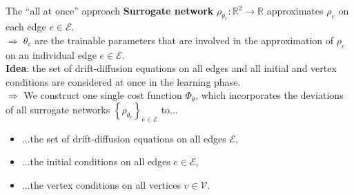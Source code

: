 \documentclass[9pt]{beamer}
\begin{document}
\begin{frame}{The “all at once” approach}
    \textbf{Surrogate network} $\rho_{\theta_e} \colon \mathbb{R}^2 \to \mathbb{R}$ approximates $\rho_e$ on each edge $e \in \mathcal{E}$. \\
    $\Rightarrow \; \theta_e$ are the trainable parameters that are involved in the approximation of $\rho_e$ on an individual edge $e \in \mathcal{E}$. \\
    \vspace{5mm}
    \textbf{Idea}: the set of drift-diffusion equations on all edges and all initial and vertex conditions are considered at once in the learning phase. \\
    \vspace{5mm}
    $\Rightarrow$ We construct one single cost function $\Phi_{\theta}$, which incorporates the deviations of all surrogate networks $\left\{\rho_{\theta_e} \right\}_{e \in \mathcal{E}}$ to$\ldots$
    \begin{itemize}
        \item $\ldots$the set of drift-diffusion equations on all edges $\mathcal{E}$,
        \item $\ldots$the initial conditions on all edges $e \in \mathcal{E}$,
        \item $\ldots$the vertex conditions on all vertices $v \in \mathcal{V}$.
    \end{itemize} 
\end{frame}
\end{document}

